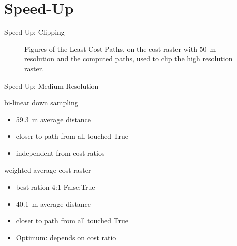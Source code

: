 \documentclass[usenames,dvipsnames,aspectratio=169]{beamer}
\begin{document}
\section{Speed-Up}
	\begin{frame}{Speed-Up: Clipping}
		\begin{figure}
			\centering
			
			\qquad
			
			\caption{Figures of the Least Cost Paths, on the cost raster with 50~m resolution and the computed paths, used to clip the high resolution raster.}
			\label{fig:clipping}
		\end{figure}
	\end{frame}


	\begin{frame}{Speed-Up: Medium Resolution}
		\begin{minipage}[t]{0.48\textwidth}
		bi-linear down sampling
		\begin{itemize}
			\item 59.3~m average distance
			\item closer to path from all touched True
			
			\item independent from cost ratios
		\end{itemize}
		\end{minipage}
		\hfill	
		\begin{minipage}[t]{0.48\textwidth}
			weighted average cost raster
			\begin{itemize}
				\item best ration 4:1 False:True
				\item 40.1~m average distance
				\item closer to path from all touched True
				\item Optimum: depends on cost ratio
			\end{itemize}
		\end{minipage}
	\end{frame}
\end{document}
